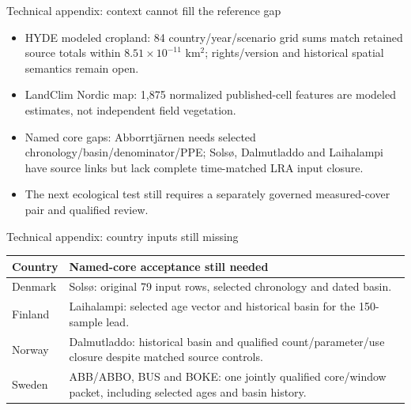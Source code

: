 \begin{frame}{Technical appendix: context cannot fill the reference gap}
\small
\begin{itemize}
\item HYDE modeled cropland: 84 country/year/scenario grid sums match retained source totals within $8.51\times10^{-11}$ km$^2$; rights/version and historical spatial semantics remain open.
\item LandClim Nordic map: 1,875 normalized published-cell features are modeled estimates, not independent field vegetation.
\item Named core gaps: Abborrtj\"arnen needs selected chronology/basin/denominator/PPE; Sols\o{}, Dalmutladdo and Laihalampi have source links but lack complete time-matched LRA input closure.
\item The next ecological test still requires a separately governed measured-cover pair and qualified review.
\end{itemize}
\end{frame}
\begin{frame}{Technical appendix: country inputs still missing}
\small
\begin{tabular}{p{}p{}}
\toprule
Country & Named-core acceptance still needed \\
\midrule
Denmark & Sols\o{}: original 79 input rows, selected chronology and dated basin. \\
Finland & Laihalampi: selected age vector and historical basin for the 150-sample lead. \\
Norway & Dalmutladdo: historical basin and qualified count/parameter/use closure despite matched source controls. \\
Sweden & ABB/ABBO, BUS and BOKE: one jointly qualified core/window packet, including selected ages and basin history. \\
\bottomrule
\end{tabular}
\end{frame}

